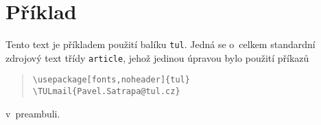 \documentclass[a4paper,12pt,twoside]{article}
\newcommand{\cmdfont}[1]{\texttt{\color{\tulcolor}#1}}
\newcommand{\cmd}[1]{\cmdfont{\textbackslash #1}}
\begin{document}
\section{Příklad}

Tento text je příkladem použití balíku \cmdfont{tul}. Jedná se o~celkem
standardní zdrojový text třídy \cmdfont{article}, jehož jedinou úpravou bylo
použití příkazů

\begin{quote}
\cmd{usepackage[fonts,noheader]\{tul\}}\\
\cmd{TULmail\{Pavel.Satrapa@tul.cz\}}
\end{quote}

v~preambuli.
\end{document}
